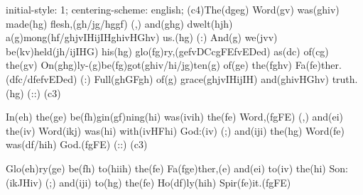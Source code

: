 initial-style: 1;
centering-scheme: english;
(c4)The(dgeg) Word(gv) was(ghiv) made(hg) flesh,(gh/jg/hggf) (,) and(ghg) dwelt(hjh) a(g)mong(hf/ghjvIHijIHghivHGhv) us.(hg) (:) And(g) we(jvv) be(kv)held(jh/ijIHG) his(hg) glo(fg)ry,(gefvDCcgFEfvEDed) as(dc) of(cg) the(gv) On(ghg)ly-(g)be(fg)got(ghiv/hi/jg)ten(g) of(ge) the(fghv) Fa(fe)ther.(dfc/dfefvEDed) (:) Full(ghGFgh) of(g) grace(ghjvIHijIH) and(ghivHGhv) truth.(hg) (::) (c3)



In(eh) the(ge) be(fh)gin(gf)ning(hi) was(ivih) the(fe) Word,(fgFE) (,) and(ei) the(iv) Word(ikj) was(hi) with(ivHFhi) God:(iv) (;) and(iji) the(hg) Word(fe) was(df/hih) God.(fgFE) (::) (c3) 

Glo(eh)ry(ge) be(fh) to(hiih) the(fe) Fa(fge)ther,(e) and(ei) to(iv) the(hi) Son:(ikJHiv) (;) and(iji) to(hg) the(fe) Ho(df)ly(hih) Spir(fe)it.(fgFE)

